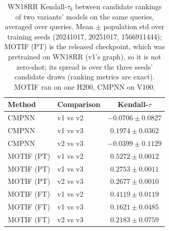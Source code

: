 \documentclass{article}
\begin{document}
\begin{table}[t]
\centering
\small
\begin{tabular}{||l||l||c||}
\hline
\textbf{Method} & \textbf{Comparison} & \textbf{Kendall-$\tau$} \\
\hline\hline
CMPNN & v1 vs v2 & $-0.0706 \pm 0.0827$ \\
\hline
CMPNN & v1 vs v3 & $0.1974 \pm 0.0362$ \\
\hline
CMPNN & v2 vs v3 & $-0.0399 \pm 0.1129$ \\
\hline
\hline
MOTIF (PT) & v1 vs v2 & $0.5272 \pm 0.0012$ \\
\hline
MOTIF (PT) & v1 vs v3 & $0.2753 \pm 0.0011$ \\
\hline
MOTIF (PT) & v2 vs v3 & $0.2677 \pm 0.0010$ \\
\hline
\hline
MOTIF (FT) & v1 vs v2 & $0.4119 \pm 0.0119$ \\
\hline
MOTIF (FT) & v1 vs v3 & $0.1621 \pm 0.0485$ \\
\hline
MOTIF (FT) & v2 vs v3 & $0.2183 \pm 0.0759$ \\
\hline
\end{tabular}
\caption{WN18RR Kendall-$\tau_b$ between candidate rankings of two variants' models on the same queries, averaged over queries. Mean $\pm$ population std over training seeds (20241017, 20251017, 1566911444); MOTIF (PT) is the released checkpoint, which was pretrained on WN18RR (v1's graph), so it is not zero-shot; its spread is over the three seeds' candidate draws (ranking metrics are exact). MOTIF ran on one H200, CMPNN on V100. }
\label{tab:wordnet_link_prediction_seed_invariance}
\end{table}
\end{document}
